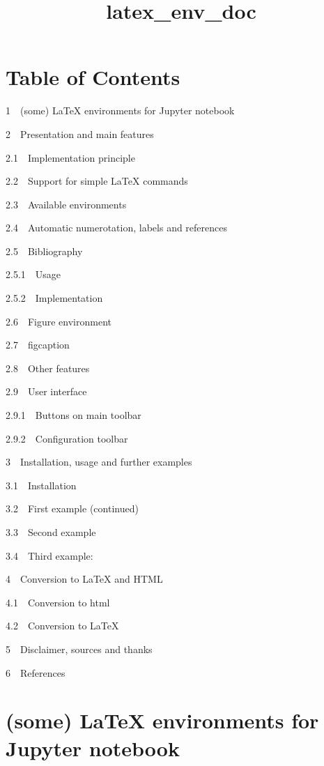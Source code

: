 \documentclass[11pt]{article}
\title{latex\_env\_doc}
\begin{document}
    
    
    \maketitle
    
    

    
    \section{Table of Contents}\label{table-of-contents}

{1~~}(some) LaTeX environments for Jupyter notebook

{2~~}Presentation and main features

{2.1~~}Implementation principle

{2.2~~}Support for simple LaTeX commands

{2.3~~}Available environments

{2.4~~}Automatic numerotation, labels and references

{2.5~~}Bibliography

{2.5.1~~}Usage

{2.5.2~~}Implementation

{2.6~~}Figure environment

{2.7~~}figcaption

{2.8~~}Other features

{2.9~~}User interface

{2.9.1~~}Buttons on main toolbar

{2.9.2~~}Configuration toolbar

{3~~}Installation, usage and further examples

{3.1~~}Installation

{3.2~~}First example (continued)

{3.3~~}Second example

{3.4~~}Third example:

{4~~}Conversion to LaTeX and HTML

{4.1~~}Conversion to html

{4.2~~}Conversion to LaTeX

{5~~}Disclaimer, sources and thanks

{6~~}References

    \section{(some) LaTeX environments for Jupyter
notebook}\label{some-latex-environments-for-jupyter-notebook}
\end{document}
